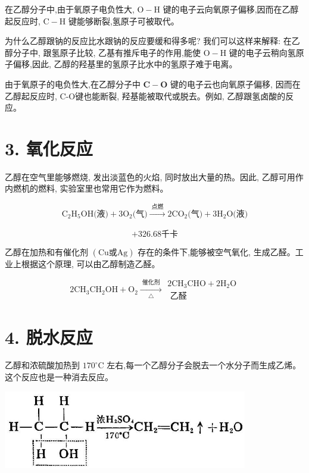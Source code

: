 \documentclass[10pt]{article}
\begin{document}
在乙醇分子中,由于氧原子电负性大, \(\mathrm{O} - \mathrm{H}\) 键的电子云向氧原子偏移,因而在乙醇起反应时, \(\mathrm{C} - \mathrm{H}\) 键能够断裂,氢原子可被取代。

为什么乙醇跟钠的反应比水跟钠的反应要缓和得多呢? 我们可以这样来解释: 在乙醇分子中, 跟氢原子比较, 乙基有推斥电子的作用,能使 \(\mathrm{O} - \mathrm{H}\) 键的电子云稍向氢原子偏移,因此, 乙醇的羟基里的氢原子比水中的氢原子难于电离。

由于氧原子的电负性大,在乙醇分子中 \(\mathbf{C} - \mathbf{O}\) 键的电子云也向氧原子偏移, 因而在乙醇起反应时, C-O键也能断裂, 羟基能被取代或脱去。例如, 乙醇跟氢卤酸的反应。

\section*{3. 氧化反应}

乙醇在空气里能够燃烧, 发出淡蓝色的火焰, 同时放出大量的热。因此, 乙醇可用作内燃机的燃料, 实验室里也常用它作为燃料。

\[
{\mathrm{C}}_{2}{\mathrm{H}}_{5}\mathrm{{OH}}\text{(液)} + 3{\mathrm{O}}_{2}\text{(气)}\xrightarrow[]{\text{ 点燃 }}2{\mathrm{{CO}}}_{2}\text{(气)} + 3{\mathrm{H}}_{2}\mathrm{O}\text{(液)}
\]

\[
+ {326.68}\text{千卡}
\]

乙醇在加热和有催化剂 \(\left( {\mathrm{{Cu}}\text{或}\mathrm{{Ag}}}\right)\) 存在的条件下,能够被空气氧化, 生成乙醛。工业上根据这个原理, 可以由乙醇制造乙醛。

\[
2{\mathrm{{CH}}}_{3}{\mathrm{{CH}}}_{2}\mathrm{{OH}} + {\mathrm{O}}_{2}\xrightarrow[\bigtriangleup ]{\text{ 催化剂 }}\begin{matrix} 2{\mathrm{{CH}}}_{3}\mathrm{{CHO}} + 2{\mathrm{H}}_{2}\mathrm{O} \\ \text{ 乙醛 } \end{matrix}
\]

\section*{4. 脱水反应}

乙醇和浓硫酸加热到 \({170}^{ \circ }\mathrm{C}\) 左右,每一个乙醇分子会脱去一个水分子而生成乙烯。这个反应也是一种消去反应。

\begin{center}
\includegraphics[max width=0.8\textwidth]{images/01912d16-be99-77bb-9535-4f3ed8d9946f_117_285530.jpg}
\end{center}
\end{document}
